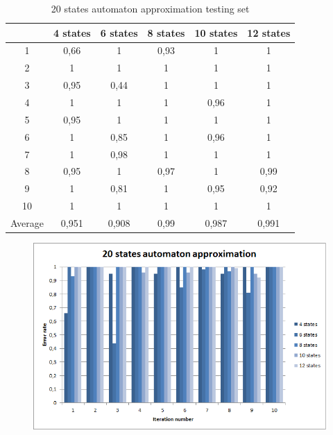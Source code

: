 \documentclass[runningheads,a4paper]{llncs}
\begin{document}
\begin{table}[]
\centering
\caption{20 states automaton approximation testing set}
\label{my-label}
\begin{tabular}{@{}cccccc@{}}
\toprule
        & 4 states & 6 states & 8 states & 10 states & 12 states    \\ \midrule
1       & 0,66     & 1        & 0,93     & 1         & 1 \\
2       & 1        & 1        & 1        & 1         & 1 \\
3       & 0,95     & 0,44     & 1        & 1         & 1 \\
4       & 1        & 1        & 1        & 0,96      & 1   \\
5       & 0,95     & 1        & 1        & 1         & 1   \\
6       & 1        & 0,85     & 1        & 0,96      & 1    \\
7       & 1        & 0,98     & 1        & 1         & 1    \\
8       & 0,95     & 1        & 0,97     & 1         & 0,99     \\
9       & 1        & 0,81     & 1        & 0,95      & 0,92 \\
10      & 1        & 1        & 1        & 1         & 1  \\
Average & 0,951    & 0,908    & 0,99     & 0,987     & 0,991  \\ \bottomrule
\end{tabular}
\end{table}

\begin{figure}
\centering
\includegraphics[scale=1]{2.png}
\end{figure}
\end{document}
